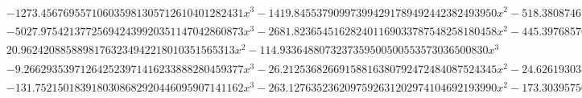\documentclass{article}
\begin{document}
\begin{landscape}
\begin{eqnarray*}
\begin{array}{cc}
\begin{array}{cc}
 -1273.456769557106035981305712610401282431 x^3-1419.845537909973994291789492442382493950 x^2-518.3808746744515271685012294896288512258 x-61.49453858554307972792449581922980162914 & x\geq -\frac{3}{8}\land x<-\frac{1}{4} \\
 -5027.975421377256942439920351147042860873 x^3-2681.823654516282401169033787548258180458 x^2-445.3976857613274356461331323169463985220 x-23.03946300405763933092055680907698270959 & x\geq -\frac{1}{4}\land x<-\frac{1}{8} \\
 20.96242088588981763234942218010351565313 x^2-114.9336488073237359500500553573036500830 x^3 & x\geq -\frac{1}{8}\land x<0 \\
 -9.266293539712642523971416233888280459377 x^3-26.21253682669158816380792472484087524345 x^2-24.62619303424524875570160074801690910877 x-7.679949747266303115865092257064314324698 & x\geq -1\land x<-\frac{3}{4} \\
 -131.7521501839180308682920446095907141162 x^3-263.1276352362097592631202974104692193990 x^2-173.3039575614259125736290993924615685461 x-37.59725105907197794370777170073132951421 & x\geq -\frac{3}{4}\land x<-\frac{1}{2}
\end{array}


\end{array}
\end{eqnarray*}
\end{landscape}
\end{document}
